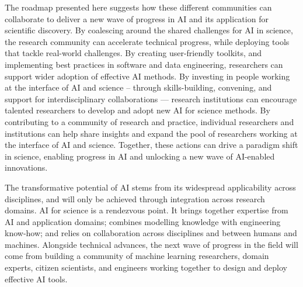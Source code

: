 The roadmap presented here suggests how these different communities can
collaborate to deliver a new wave of progress in AI and its application
for scientific discovery. By coalescing around the shared challenges for
AI in science, the research community can accelerate technical progress,
while deploying tools that tackle real-world challenges. By creating
user-friendly toolkits, and implementing best practices in software and
data engineering, researchers can support wider adoption of effective AI
methods. By investing in people working at the interface of AI and
science -- through skills-building, convening, and support for
interdisciplinary collaborations --- research institutions can encourage
talented researchers to develop and adopt new AI for science methods. By
contributing to a community of research and practice, individual
researchers and institutions can help share insights and expand the pool
of researchers working at the interface of AI and science. Together,
these actions can drive a paradigm shift in science, enabling progress
in AI and unlocking a new wave of AI-enabled innovations.

The transformative potential of AI stems from its widespread
applicability across disciplines, and will only be achieved through
integration across research domains. AI for science is a rendezvous
point. It brings together expertise from AI and application domains;
combines modelling knowledge with engineering know-how; and relies on
collaboration across disciplines and between humans and machines.
Alongside technical advances, the next wave of progress in the field
will come from building a community of machine learning researchers,
domain experts, citizen scientists, and engineers working together to
design and deploy effective AI tools.
